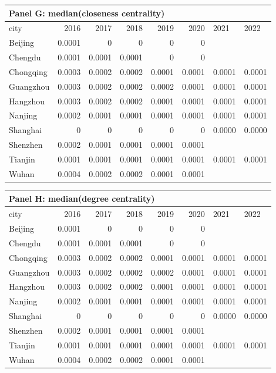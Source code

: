 \begin{tabular}{lrrrrrll}
\multicolumn{8}{l}{\textbf{Panel G: median(closeness centrality)}}\\
\hline
 city      &   2016 &   2017 &   2018 &   2019 &   2020 & 2021   & 2022   \\
\hline
 Beijing   & 0.0001 & 0      & 0      & 0      & 0      &        &        \\
 Chengdu   & 0.0001 & 0.0001 & 0.0001 & 0      & 0      &        &        \\
 Chongqing & 0.0003 & 0.0002 & 0.0002 & 0.0001 & 0.0001 & 0.0001 & 0.0001 \\
 Guangzhou & 0.0003 & 0.0002 & 0.0002 & 0.0002 & 0.0001 & 0.0001 & 0.0001 \\
 Hangzhou  & 0.0003 & 0.0002 & 0.0002 & 0.0001 & 0.0001 & 0.0001 & 0.0001 \\
 Nanjing   & 0.0002 & 0.0001 & 0.0001 & 0.0001 & 0.0001 & 0.0001 & 0.0001 \\
 Shanghai  & 0      & 0      & 0      & 0      & 0      & 0.0000 & 0.0000 \\
 Shenzhen  & 0.0002 & 0.0001 & 0.0001 & 0.0001 & 0.0001 &        &        \\
 Tianjin   & 0.0001 & 0.0001 & 0.0001 & 0.0001 & 0.0001 & 0.0001 & 0.0001 \\
 Wuhan     & 0.0004 & 0.0002 & 0.0002 & 0.0001 & 0.0001 &        &        \\
\hline
\end{tabular}

\begin{tabular}{lrrrrrll}
    \multicolumn{8}{l}{\textbf{Panel H: median(degree centrality)}}\\
\hline
 city      &   2016 &   2017 &   2018 &   2019 &   2020 & 2021   & 2022   \\
\hline
 Beijing   & 0.0001 & 0      & 0      & 0      & 0      &        &        \\
 Chengdu   & 0.0001 & 0.0001 & 0.0001 & 0      & 0      &        &        \\
 Chongqing & 0.0003 & 0.0002 & 0.0002 & 0.0001 & 0.0001 & 0.0001 & 0.0001 \\
 Guangzhou & 0.0003 & 0.0002 & 0.0002 & 0.0002 & 0.0001 & 0.0001 & 0.0001 \\
 Hangzhou  & 0.0003 & 0.0002 & 0.0002 & 0.0001 & 0.0001 & 0.0001 & 0.0001 \\
 Nanjing   & 0.0002 & 0.0001 & 0.0001 & 0.0001 & 0.0001 & 0.0001 & 0.0001 \\
 Shanghai  & 0      & 0      & 0      & 0      & 0      & 0.0000 & 0.0000 \\
 Shenzhen  & 0.0002 & 0.0001 & 0.0001 & 0.0001 & 0.0001 &        &        \\
 Tianjin   & 0.0001 & 0.0001 & 0.0001 & 0.0001 & 0.0001 & 0.0001 & 0.0001 \\
 Wuhan     & 0.0004 & 0.0002 & 0.0002 & 0.0001 & 0.0001 &        &        \\
\hline
\end{tabular}

